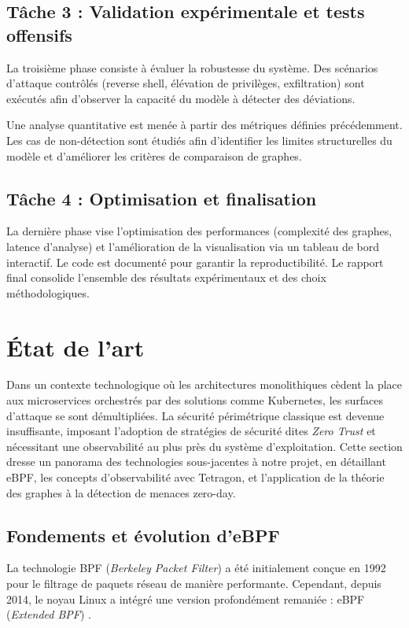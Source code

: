 \documentclass[a4paper,12pt]{article}
\begin{document}
\subsection{Tâche 3 : Validation expérimentale et tests offensifs}

La troisième phase consiste à évaluer la robustesse du système. Des scénarios d’attaque contrôlés (reverse shell, élévation de privilèges, exfiltration) sont exécutés afin d’observer la capacité du modèle à détecter des déviations.

Une analyse quantitative est menée à partir des métriques définies précédemment. Les cas de non-détection sont étudiés afin d’identifier les limites structurelles du modèle et d’améliorer les critères de comparaison de graphes.

\subsection{Tâche 4 : Optimisation et finalisation}

La dernière phase vise l’optimisation des performances (complexité des graphes, latence d’analyse) et l’amélioration de la visualisation via un tableau de bord interactif. Le code est documenté pour garantir la reproductibilité. Le rapport final consolide l’ensemble des résultats expérimentaux et des choix méthodologiques.


\section{État de l'art}

Dans un contexte technologique où les architectures monolithiques cèdent la place aux microservices orchestrés par des solutions comme Kubernetes, les surfaces d'attaque se sont démultipliées. La sécurité périmétrique classique est devenue insuffisante, imposant l'adoption de stratégies de sécurité dites \textit{Zero Trust} et nécessitant une observabilité au plus près du système d'exploitation. Cette section dresse un panorama des technologies sous-jacentes à notre projet, en détaillant eBPF, les concepts d'observabilité avec Tetragon, et l'application de la théorie des graphes à la détection de menaces zero-day.

\subsection{Fondements et évolution d'eBPF}
La technologie BPF (\textit{Berkeley Packet Filter}) a été initialement conçue en 1992 pour le filtrage de paquets réseau de manière performante. Cependant, depuis 2014, le noyau Linux a intégré une version profondément remaniée : eBPF (\textit{Extended BPF}) \cite{gbadamosi2024ebpf}. 
\end{document}
